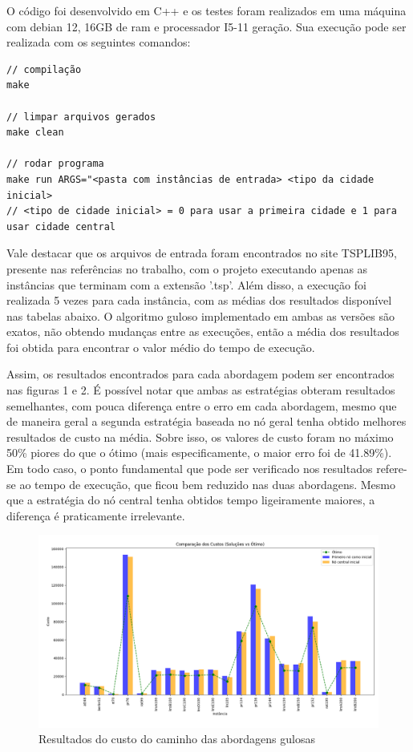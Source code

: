 \documentclass[10pt]{extarticle} %
\begin{document}
O código foi desenvolvido em C++ e os testes foram realizados em uma máquina com debian 12, 16GB de ram e processador I5-11 geração. Sua execução pode ser realizada com os seguintes comandos:

\begin{verbatim}
// compilação
make

// limpar arquivos gerados
make clean

// rodar programa
make run ARGS="<pasta com instâncias de entrada> <tipo da cidade inicial>
// <tipo de cidade inicial> = 0 para usar a primeira cidade e 1 para usar cidade central
\end{verbatim}

Vale destacar que os arquivos de entrada foram encontrados no site TSPLIB95, presente nas referências no trabalho, com o projeto executando apenas as instâncias que terminam com a extensão '.tsp'. Além disso, a execução foi realizada 5 vezes para cada instância, com as médias dos resultados disponível nas tabelas abaixo. O algoritmo guloso implementado em ambas as versões são exatos, não obtendo mudanças entre as execuções, então a média dos resultados foi obtida para encontrar o valor médio do tempo de execução.

Assim, os resultados encontrados para cada abordagem podem ser encontrados nas figuras 1 e 2. É possível notar que ambas as estratégias obteram resultados semelhantes, com pouca diferença entre o erro em cada abordagem, mesmo que de maneira geral a segunda estratégia baseada no nó geral tenha obtido melhores resultados de custo na média. Sobre isso, os valores de custo foram no máximo 50\% piores do que o ótimo (mais especificamente, o maior erro foi de 41.89\%). Em todo caso, o ponto fundamental que pode ser verificado nos resultados refere-se ao tempo de execução, que ficou bem reduzido nas duas abordagens. Mesmo que a estratégia do nó central tenha obtidos tempo ligeiramente maiores, a diferença é praticamente irrelevante.

\begin{figure}[H]
    \centering
    \includegraphics[width=1\linewidth]{graficos_custos.png}
    \caption{Resultados do custo do caminho das abordagens gulosas}
    \label{fig:Resultados abordagens gulosas}
\end{figure}
\end{document}
